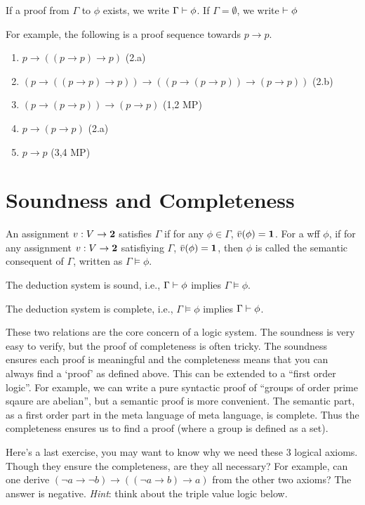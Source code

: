 If a proof from $\Gamma$ to $\phi$ exists, we write $\Gamma\vdash\phi$.
If $\Gamma=\emptyset$, we write $\vdash\phi$

For example, the following is a proof sequence towards $p\to p$.
\begin{enumerate}
    \item $p\to((p\to p)\to p)$ (2.a)
    \item $(p\to((p\to p)\to p))\to((p\to(p\to p))\to(p\to p))$ (2.b)
    \item $(p\to(p\to p))\to(p\to p)$ (1,2 MP)
    \item $p\to(p\to p)$ (2.a)
    \item $p\to p$ (3,4 MP)
\end{enumerate}

\section{Soundness and Completeness}
An assignment $v:V\to \mathbf{2}$ satisfies $\Gamma$ if for any $\phi\in\Gamma$,
$\bar{v}(\phi)=\mathbf{1}$. For a wff $\phi$, if for any assignment 
$v:V\to\mathbf{2}$ satisfiying $\Gamma$, $\bar{v}(\phi)=\mathbf{1}$, then $\phi$ is
called the semantic consequent of $\Gamma$, written as $\Gamma\models\phi$.

\begin{theorem}
    The deduction system is sound, i.e., $\Gamma\vdash\phi$ implies
    $\Gamma\models\phi$. 
\end{theorem}

\begin{theorem}
    The deduction system is complete, i.e., $\Gamma\models\phi$ implies
    $\Gamma\vdash\phi$. 
\end{theorem}

These two relations are the core concern of a logic system. The soundness
is very easy to verify, but the proof of completeness is often tricky.
The soundness ensures each proof is meaningful and the completeness means
that you can always find a `proof' as defined above. This can be extended
to a ``first order logic''. For example, we can write a pure syntactic
proof of ``groups of order prime sqaure are abelian'', but a semantic
proof is more convenient. The semantic part, as a first order part in
the meta language of meta language, is complete. Thus the completeness
ensures us to find a proof (where a group is defined as a set). 

Here's a last exercise, you may want to know why we need these 3
logical axioms. Though they ensure the completeness, are they all
necessary? For example, can one derive 
$(\neg a\to\neg b)\to((\neg a\to b)\to a)$ from the other two axioms? 
The answer is negative. {\it Hint}: think about the triple value logic
below. 

